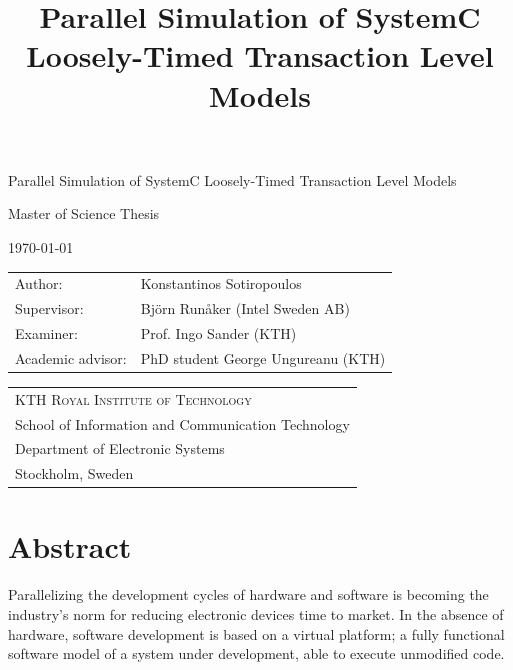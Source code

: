 \documentclass[11pt]{article}
\date{}
\title{Parallel Simulation of SystemC Loosely-Timed Transaction Level Models}
\begin{document}
\begin{titlepage}
\pagestyle{empty}
\begin{center}
  
  \vspace{5cm}
  
  \huge{Parallel Simulation of SystemC Loosely-Timed Transaction Level Models}
  \vspace{5cm} 
  
  \Large Master of Science Thesis\\
  \vspace{2cm}
  
  \today
  \vspace{6cm}
  
  \begin{tabular}{ll} 
  \noindent Author: 	 		& Konstantinos Sotiropoulos \\
  \noindent Supervisor: 		& Björn Runåker (Intel Sweden AB) \\ 

  \noindent Examiner:  	 		& Prof. Ingo Sander (KTH)\\ 
  \noindent Academic advisor: 	        & PhD student George Ungureanu (KTH)
  \end{tabular}
  \vspace{2.5cm}

  \small
  \begin{tabular}{l}
  \textsc{KTH Royal Institute of Technology}\\
          School of Information and Communication Technology\\
          Department of Electronic Systems\\
	  Stockholm, Sweden
  \end{tabular}
  
\end{center} 
\end{titlepage}
\clearpage

\section*{Abstract}
\label{sec:orge758113}
\pagestyle{empty}

Parallelizing the development cycles of hardware and software is becoming the industry's norm for reducing electronic devices time to market.
In the absence of hardware, software development is based on a virtual platform; 
a fully functional software model of a system under development, able to execute unmodified code.
\end{document}
